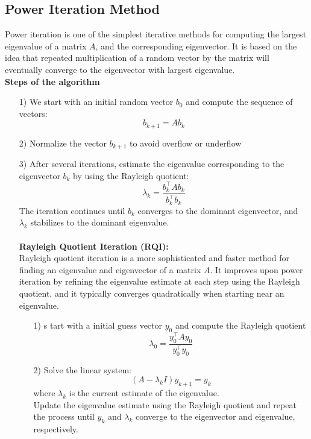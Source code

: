 \documentclass[12pt]{article}
\begin{document}
\subsection{Power Iteration Method}
Power iteration is one of the simplest iterative methods for computing the largest eigenvalue of a matrix $A$, and the corresponding eigenvector. It is based on the idea that repeated multiplication of a random vector by the matrix will eventually converge to the eigenvector with largest eigenvalue.\\
\textbf{Steps of the algorithm}\\
\begin{enumerate}
    \item[1)] We start with an initial random vector $b_0$ and compute the sequence of vectors:
        $$b_{k+1} = Ab_k$$
    \item[2)] Normalize the vector $b_{k+1}$ to avoid overflow or underflow 
    \item[3)] After several iterations, estimate the eigenvalue corresponding to the eigenvector $b_k$ by using the Rayleigh quotient:
    $$\lambda_k = \frac{b_k^\top Ab_k}{b_k^\top b_k}$$
    The iteration continues until $b_k$ converges to the dominant eigenvector, and $\lambda_k$ stabilizes to the dominant eigenvalue.\\ \\
    \textbf{Rayleigh Quotient Iteration (RQI):} \\
    Rayleigh quotient iteration is a more sophisticated and faster method for finding an eigenvalue and eigenvector of a matrix $A$. It improves upon power iteration by refining the eigenvalue estimate at each step using the Rayleigh quotient, and it typically converges quadratically when starting near an eigenvalue.
    \begin{enumerate}
        \item[1)] s tart with a initial guess vector $y_0$ and compute the Rayleigh quotient
        $$\lambda_0 = \frac{y_0^\top Ay_0}{y_0^\top y_0}$$
        \item[2)]  Solve the linear system:
        $$(A - \lambda_k I)y_{k+1} = y_k$$
        where $\lambda_k$ is the current estimate of the eigenvalue.\\
        Update the eigenvalue estimate using the Rayleigh quotient and repeat the process until $y_k$ and $\lambda_k$ converge to the eigenvector and eigenvalue, respectively.
    \end{enumerate} 
\end{enumerate}
\end{document}
